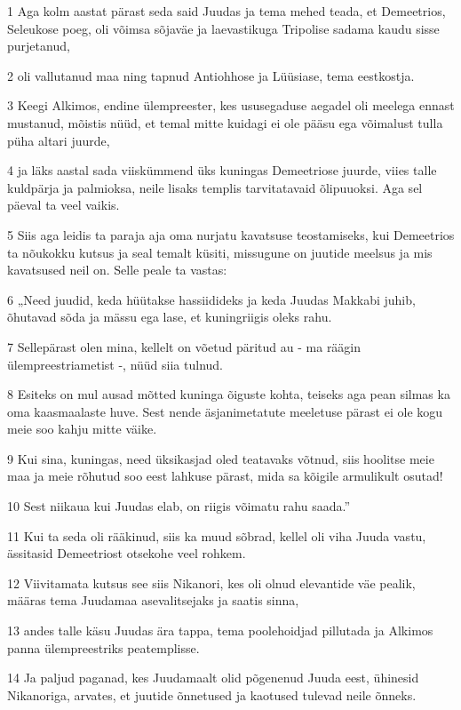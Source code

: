 \par 1 Aga kolm aastat pärast seda said Juudas ja tema mehed teada, et Demeetrios, Seleukose poeg, oli võimsa sõjaväe ja laevastikuga Tripolise sadama kaudu sisse purjetanud,
\par 2 oli vallutanud maa ning tapnud Antiohhose ja Lüüsiase, tema eestkostja.
\par 3 Keegi Alkimos, endine ülempreester, kes ususegaduse aegadel oli meelega ennast mustanud, mõistis nüüd, et temal mitte kuidagi ei ole pääsu ega võimalust tulla püha altari juurde,
\par 4 ja läks aastal sada viiskümmend üks kuningas Demeetriose juurde, viies talle kuldpärja ja palmioksa, neile lisaks templis tarvitatavaid õlipuuoksi. Aga sel päeval ta veel vaikis.
\par 5 Siis aga leidis ta paraja aja oma nurjatu kavatsuse teostamiseks, kui Demeetrios ta nõukokku kutsus ja seal temalt küsiti, missugune on juutide meelsus ja mis kavatsused neil on. Selle peale ta vastas:
\par 6 „Need juudid, keda hüütakse hassiidideks ja keda Juudas Makkabi juhib, õhutavad sõda ja mässu ega lase, et kuningriigis oleks rahu.
\par 7 Sellepärast olen mina, kellelt on võetud päritud au - ma räägin ülempreestriametist -, nüüd siia tulnud.
\par 8 Esiteks on mul ausad mõtted kuninga õiguste kohta, teiseks aga pean silmas ka oma kaasmaalaste huve. Sest nende äsjanimetatute meeletuse pärast ei ole kogu meie soo kahju mitte väike.
\par 9 Kui sina, kuningas, need üksikasjad oled teatavaks võtnud, siis hoolitse meie maa ja meie rõhutud soo eest lahkuse pärast, mida sa kõigile armulikult osutad!
\par 10 Sest niikaua kui Juudas elab, on riigis võimatu rahu saada.”
\par 11 Kui ta seda oli rääkinud, siis ka muud sõbrad, kellel oli viha Juuda vastu, ässitasid Demeetriost otsekohe veel rohkem.
\par 12 Viivitamata kutsus see siis Nikanori, kes oli olnud elevantide väe pealik, määras tema Juudamaa asevalitsejaks ja saatis sinna,
\par 13 andes talle käsu Juudas ära tappa, tema poolehoidjad pillutada ja Alkimos panna ülempreestriks peatemplisse.
\par 14 Ja paljud paganad, kes Juudamaalt olid põgenenud Juuda eest, ühinesid Nikanoriga, arvates, et juutide õnnetused ja kaotused tulevad neile õnneks.


